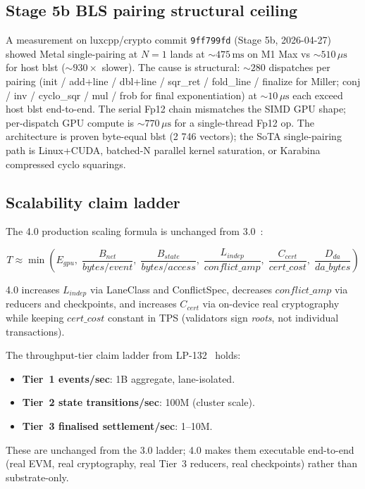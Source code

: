 \subsection{Stage 5b BLS pairing structural ceiling}

A measurement on luxcpp/crypto commit \texttt{9ff799fd} (Stage 5b,
2026-04-27) showed Metal single-pairing at $N{=}1$ lands at
${\sim}475\,\text{ms}$ on M1 Max vs ${\sim}510\,\mu\text{s}$ for host
blst (${\sim}930\times$ slower). The cause is structural:
${\sim}280$ dispatches per pairing (init / add+line / dbl+line /
sqr\_ret / fold\_line / finalize for Miller; conj / inv / cyclo\_sqr /
mul / frob for final exponentiation) at ${\sim}10\,\mu\text{s}$ each
exceed host blst end-to-end. The serial Fp12 chain mismatches the
SIMD GPU shape; per-dispatch GPU compute is ${\sim}770\,\mu\text{s}$
for a single-thread Fp12 op. The architecture is proven byte-equal
blst (2 746 vectors); the SoTA single-pairing path is Linux+CUDA,
batched-N parallel kernel saturation, or Karabina compressed cyclo
squarings.

\subsection{Scalability claim ladder}

The 4.0 production scaling formula is unchanged from
3.0~\cite{lp010-quasarstm-3,lp132-quasarexec}:

\[
T \approx \min\!\left(
E_{\mathit{gpu}},\;
\frac{B_{\mathit{net}}}{\mathit{bytes/event}},\;
\frac{B_{\mathit{state}}}{\mathit{bytes/access}},\;
\frac{L_{\mathit{indep}}}{\mathit{conflict\_amp}},\;
\frac{C_{\mathit{cert}}}{\mathit{cert\_cost}},\;
\frac{D_{\mathit{da}}}{\mathit{da\_bytes}}
\right)
\]

4.0 increases $L_{\mathit{indep}}$ via LaneClass and ConflictSpec,
decreases $\mathit{conflict\_amp}$ via reducers and checkpoints, and
increases $C_{\mathit{cert}}$ via on-device real cryptography while
keeping $\mathit{cert\_cost}$ constant in TPS (validators sign
\emph{roots}, not individual transactions).

The throughput-tier claim ladder from LP-132~\cite{lp132-quasarexec}
holds:

\begin{itemize}[leftmargin=2em]
\item \textbf{Tier~1 events/sec}: 1B aggregate, lane-isolated.
\item \textbf{Tier~2 state transitions/sec}: 100M (cluster scale).
\item \textbf{Tier~3 finalised settlement/sec}: 1--10M.
\end{itemize}

These are unchanged from the 3.0 ladder; 4.0 makes them executable
end-to-end (real EVM, real cryptography, real Tier~3 reducers, real
checkpoints) rather than substrate-only.


